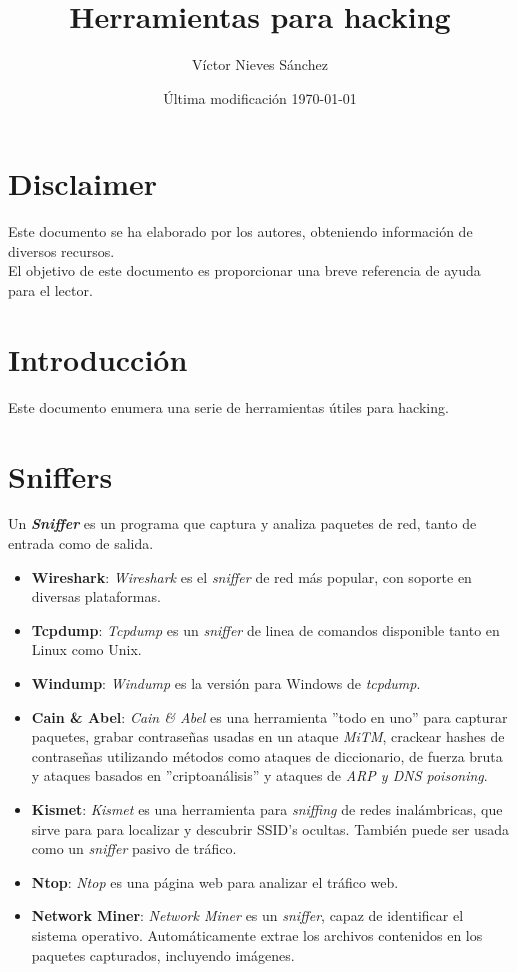 \documentclass[bibliography=totocnumbered]{scrartcl}
\title{Herramientas para hacking}
\author{Víctor Nieves Sánchez}
\date{Última modificación \today{}}
\begin{document}
\maketitle
\section*{Disclaimer}
Este documento se ha elaborado por los autores, obteniendo información de diversos recursos.\\

El objetivo de este documento es proporcionar una breve referencia de ayuda para el lector.

\newpage
\tableofcontents

\newpage

\newpage
\section{Introducción}
Este documento enumera una serie de herramientas útiles para hacking.

\section{Sniffers}
Un \textbf{\textit{Sniffer}} es un programa que captura y analiza paquetes de red, tanto de entrada como de salida.
\begin{itemize}
\item \textbf{Wireshark}\parencite{wireshark}: \textit{Wireshark} es el \textit{sniffer} de red más popular, con soporte en diversas plataformas.
\item \textbf{Tcpdump}\parencite{tcpdump}: \textit{Tcpdump} es un \textit{sniffer} de linea de comandos disponible tanto en Linux como Unix.
\item \textbf{Windump}\parencite{windump}: \textit{Windump} es la versión para Windows de \textit{tcpdump}\parencite{tcpdump}.
\item \textbf{Cain \& Abel}\parencite{cain}: \textit{Cain \& Abel} es una herramienta ''todo en uno'' para capturar paquetes, grabar contraseñas usadas en un ataque \textit{MiTM}\parencite{mitm}, crackear hashes de contraseñas utilizando métodos como ataques de diccionario, de fuerza bruta y ataques basados en ''criptoanálisis'' y ataques de \textit{ARP\parencite{arp} y DNS\parencite{dns} poisoning}.
\item \textbf{Kismet}\parencite{kismet}: \textit{Kismet} es una herramienta para \textit{sniffing} de redes inalámbricas, que sirve para para localizar y descubrir SSID's ocultas. También puede ser usada como un \textit{sniffer} pasivo de tráfico.
\item \textbf{Ntop}\parencite{ntop}: \textit{Ntop} es una página web para analizar el tráfico web.
\item \textbf{Network Miner}\parencite{networkminer}: \textit{Network Miner} es un \textit{sniffer}, capaz de identificar el sistema operativo. Automáticamente extrae los archivos contenidos en los paquetes capturados, incluyendo imágenes. 
\end{itemize}
\end{document}
